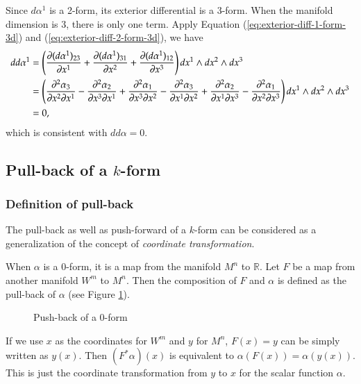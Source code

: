 \documentclass[11pt, a4paper]{book}
\begin{document}
\begin{Example}
  Since $d\alpha^1$ is a 2-form, its exterior differential is a 3-form. When the manifold
  dimension is 3, there is only one term. Apply Equation
  (\ref{eq:exterior-diff-1-form-3d}) and (\ref{eq:exterior-diff-2-form-3d}), we have
  \begin{equation}
    \begin{aligned}
      dd\alpha^1 &= \left( \frac{\partial (d\alpha^1)_{23}}{\partial x^1} + \frac{\partial
          (d\alpha^1)_{31}}{\partial x^2} + \frac{\partial (d\alpha^1)_{12}}{\partial x^3}
      \right) dx^1 \wedge dx^2 \wedge
      dx^3 \\
      &= \left( \frac{\partial^2 \alpha_3}{\partial x^2 \partial x^1} - \frac{\partial^2
          \alpha_2}{\partial x^3 \partial x^1} + \frac{\partial^2 \alpha_1}{\partial x^3 \partial
          x^2} - \frac{\partial^2 \alpha_3}{\partial x^1 \partial x^2} + \frac{\partial^2
          \alpha_2}{\partial x^1 \partial x^3} - \frac{\partial^2 \alpha_1}{\partial x^2 \partial
          x^3} \right) dx^1 \wedge dx^2 \wedge dx^3 \\
      &= 0,
    \end{aligned}
  \end{equation}
  which is consistent with $dd\alpha = 0$.
\end{Example}

\subsection{Pull-back of a $k$-form}

\subsubsection{Definition of pull-back}

The pull-back as well as push-forward of a $k$-form can be considered as a generalization
of the concept of \emph{coordinate transformation}.

When $\alpha$ is a 0-form, it is a map from the manifold $M^n$ to $\mathbb{R}$. Let $F$ be
a map from another manifold $W^m$ to $M^n$. Then the composition of $F$ and $\alpha$ is
defined as the pull-back of $\alpha$ (see Figure \ref{fig:push-back-0-form}).
\begin{figure}[htbp]
  \centering
  \caption{Push-back of a 0-form}
  \label{fig:push-back-0-form}
\end{figure}
If we use $x$ as the coordinates for $W^m$ and $y$ for $M^n$, $F(x)=y$ can be simply
written as $y(x)$. Then $\left( F^{*}\alpha \right)(x)$ is equivalent to
$\alpha(F(x)) = \alpha(y(x))$. This is just the coordinate transformation from $y$ to $x$
for the scalar function $\alpha$.
\end{document}
